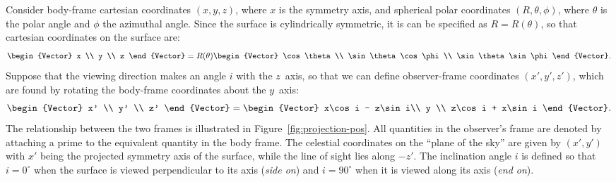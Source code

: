 Consider body-frame cartesian coordinates $(x,y,z)$, where \(x\) is
the symmetry axis, and spherical polar coordinates
\((R, \theta, \phi)\), where \(\theta\) is the polar angle and
\(\phi\) the azimuthal angle.  Since the surface is cylindrically
symmetric, it is can be specified as $R = R(\theta)$, so that
cartesian coordinates on the surface are:
\begin{equation}
  \begin{Vector}
    x \\ y \\ z
  \end{Vector} 
  = R(\theta)
  \begin{Vector}
    \cos\theta \\
    \sin\theta\cos\phi \\
    \sin\theta\sin\phi
  \end{Vector}.
  \label{eq:body-frame}
\end{equation} 
Suppose that the viewing direction makes an angle \(i\) with the
\(z\)~axis, so that we can define observer-frame coordinates
\((x', y', z')\), which are found by rotating the body-frame
coordinates about the \(y\)~axis:
\begin{equation}
  \begin{Vector}
    x' \\ y' \\ z'
  \end{Vector}
  = 
  \begin{Vector}
    x\cos i - z\sin i\\
    y \\
    z\cos i + x\sin i
  \end{Vector}.
  \label{eq:Trans}
\end{equation} 
The relationship between the two frames is illustrated in
Figure~\ref{fig:projection-pos}.  All quantities in the observer's
frame are denoted by attaching a prime to the equivalent quantity in
the body frame.  The celestial coordinates on the ``plane of the sky''
are given by \((x', y')\) with \(x'\) being the projected symmetry
axis of the surface, while the line of sight lies along \(-z'\).  The
inclination angle \(i\) is defined so that \(i = 0^\circ\) when the
surface is viewed perpendicular to its axis (\textit{side on}) and
\(i = 90^\circ\) when it is viewed along its axis (\textit{end on}).


